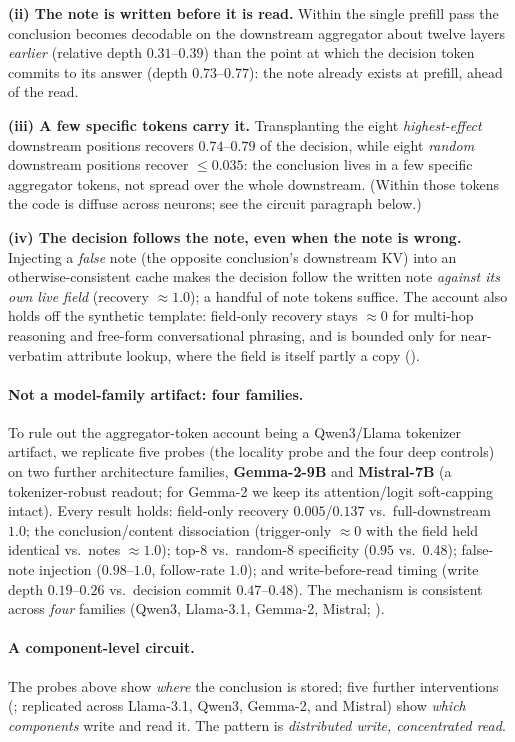 \textbf{(ii) The note is written before it is read.} Within the single prefill pass the conclusion becomes
decodable on the downstream aggregator about twelve layers \emph{earlier} (relative depth $0.31$--$0.39$)
than the point at which the decision token commits to its answer (depth $0.73$--$0.77$): the note already
exists at prefill, ahead of the read.

\textbf{(iii) A few specific tokens carry it.} Transplanting the eight \emph{highest-effect} downstream
positions recovers $0.74$--$0.79$ of the decision, while eight \emph{random} downstream positions recover
${\le}0.035$: the conclusion lives in a few specific aggregator tokens, not spread over the whole downstream.
(Within those tokens the code is diffuse across neurons; see the circuit paragraph below.)

\textbf{(iv) The decision follows the note, even when the note is wrong.} Injecting a \emph{false} note (the
opposite conclusion's downstream KV) into an otherwise-consistent cache makes the decision follow the written
note \emph{against its own live field} (recovery $\approx1.0$); a handful of note tokens suffice. The account
also holds off the synthetic template: field-only recovery stays ${\approx}0$ for multi-hop reasoning and
free-form conversational phrasing, and is bounded only for near-verbatim attribute lookup, where the field is
itself partly a copy ().

\paragraph{Not a model-family artifact: four families.} To rule out the aggregator-token account being
a Qwen3/Llama tokenizer artifact, we replicate five probes (the locality probe and the four deep
controls) on two further architecture families,
\textbf{Gemma-2-9B} and \textbf{Mistral-7B} (a tokenizer-robust readout; for Gemma-2 we keep its
attention/logit soft-capping intact). Every result holds: field-only recovery $0.005$/$0.137$ vs.\
full-downstream $1.0$; the conclusion/content dissociation (trigger-only $\approx0$ with the field held
identical vs.\ notes $\approx1.0$); top-$8$ vs.\ random-$8$ specificity ($0.95$ vs.\ $0.48$); false-note
injection ($0.98$--$1.0$, follow-rate $1.0$); and write-before-read timing (write depth $0.19$--$0.26$ vs.\
decision commit $0.47$--$0.48$). The mechanism is consistent across \emph{four} families (Qwen3, Llama-3.1,
Gemma-2, Mistral; \Cref{app:deepmech}).

\paragraph{A component-level circuit.} The probes above show \emph{where} the conclusion is stored; five
further interventions (; replicated across Llama-3.1, Qwen3, Gemma-2, and Mistral) show
\emph{which components} write and read it. The pattern is \emph{distributed write, concentrated read}.


